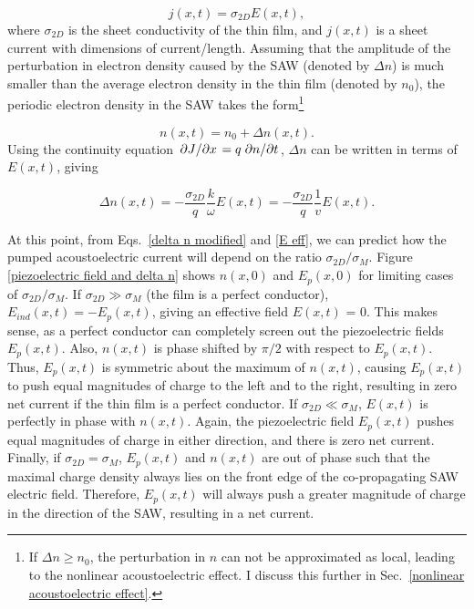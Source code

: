 \documentclass[double,12pt,1in,seploa]{beavtex}
\begin{document}
\begin{equation}
    j(x,t) = \sigma_{2D} E(x,t), \label{2D AE ohm's law}
\end{equation}
where $\sigma_{2D}$ is the sheet conductivity of the thin film, and $j(x,t)$ is a sheet current with dimensions of current/length. Assuming that the amplitude of the perturbation in electron density caused by the SAW (denoted by $\Delta n$) is much smaller than the average electron density in the thin film (denoted by $n_0$), the periodic electron density in the SAW takes the form\footnote{If $\Delta n \geq n_0$, the perturbation in $n$ can not be approximated as local, leading to the nonlinear acoustoelectric effect. I discuss this further in Sec.\ \ref{nonlinear acoustoelectric effect}.}

\begin{equation}
    n(x,t) = n_0 + \Delta n(x,t). 
\end{equation}
Using the continuity equation $\pdv*{J}{x} = q \pdv*{n}{t}$, $\Delta n$ can be written in terms of $E(x,t)$, giving

\begin{equation}
    \Delta n(x,t) = -\frac{\sigma_{2D}}{q} \frac{k}{\omega} E(x,t) = -\frac{\sigma_{2D}}{q} \frac{1}{v}E(x,t). \label{delta n modified}
\end{equation}

At this point, from Eqs.\ \ref{delta n modified} and \ref{E eff}, we can predict how the pumped acoustoelectric current will depend on the ratio $\sigma_{2D}/\sigma_M$. Figure \ref{piezoelectric field and delta n} shows $n(x,0)$ and $E_p(x,0)$ for limiting cases of $\sigma_{2D}/\sigma_M$. If $\sigma_{2D} \gg \sigma_M$ (the film is a perfect conductor), $E_{ind}(x,t) = -E_p(x,t)$, giving an effective field $E(x,t)$ = 0. This makes sense, as a perfect conductor can completely screen out the piezoelectric fields $E_p(x,t)$. Also, $n(x,t)$ is phase shifted by $\pi/2$ with respect to $E_p(x,t)$. Thus, $E_p(x,t)$ is symmetric about the maximum of $n(x,t)$, causing $E_p(x,t)$ to push equal magnitudes of charge to the left and to the right, resulting in zero net current if the thin film is a perfect conductor. If $\sigma_{2D} \ll \sigma_M$, $E(x,t)$ is perfectly in phase with $n(x,t)$. Again, the piezoelectric field $E_p(x,t)$ pushes equal magnitudes of charge in either direction, and there is zero net current. Finally, if $\sigma_{2D} = \sigma_M$, $E_p(x,t)$ and $n(x,t)$ are out of phase such that the maximal charge density always lies on the front edge of the co-propagating SAW electric field. Therefore, $E_p(x,t)$ will always push a greater magnitude of charge in the direction of the SAW, resulting in a net current.
\end{document}
